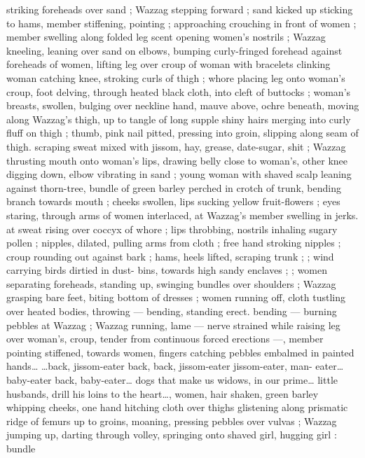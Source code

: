 {striking foreheads over sand ; Wazzag stepping forward ; sand kicked 
up sticking to hams, member stiffening, pointing ; approaching 
crouching in front of women ; member swelling along folded leg 
scent opening women's nostrils ; Wazzag kneeling, leaning over sand 
on elbows, bumping curly-fringed forehead against foreheads of 
women, lifting leg over croup of woman with bracelets clinking 
woman catching knee, stroking curls of thigh ; whore placing leg 
onto woman's croup, foot delving, through heated black cloth, into 
cleft of buttocks ; woman's breasts, swollen, bulging over neckline 
hand, mauve above, ochre beneath, moving along Wazzag's thigh, up 
to tangle of long supple shiny hairs merging into curly fluff on thigh 
; thumb, pink nail pitted, pressing into groin, slipping along seam of 
thigh. scraping sweat mixed with jissom, hay, grease, date-sugar, shit 
; Wazzag thrusting mouth onto woman's lips, drawing belly close to 
woman's, other knee digging down, elbow vibrating in sand ; young 
woman with shaved scalp leaning against thorn-tree, bundle of green 
barley perched in crotch of trunk, bending branch towards mouth ; 
cheeks swollen, lips sucking yellow fruit-flowers ; eyes staring, 
through arms of women interlaced, at Wazzag's member swelling in 
jerks. at sweat rising over coccyx of whore ; lips throbbing, nostrils 
inhaling sugary pollen ; nipples, dilated, pulling arms from cloth ; 
free hand stroking nipples ; croup rounding out against bark ; hams, 
heels lifted, scraping trunk ; ; wind carrying birds dirtied in dust- 
bins, towards high sandy enclaves ; ; women separating foreheads, 
standing up, swinging bundles over shoulders ; Wazzag grasping 
bare feet, biting bottom of dresses ; women running off, cloth 
tustling over heated bodies, throwing --- bending, standing erect. 
bending --- burning pebbles at Wazzag ; Wazzag running, lame --- 
nerve strained while raising leg over woman's, croup, tender from 
continuous forced erections ---, member pointing stiffened, towards 
women, fingers catching pebbles embalmed in painted hands{\ldots} 
{\gl}{\ldots}back, jissom-eater{\td} back, back, jissom-eater{\td} jissom-eater, man- 
eater{\ldots} baby-eater{\td} back, baby-eater{\ldots} dogs that make us widows, in 
our prime{\ldots} little husbands, drill his loins to the heart{\ldots}{\gr}, women, 
hair shaken, green barley whipping cheeks, one hand hitching cloth 
over thighs glistening along prismatic ridge of femurs up to groins, 
moaning, pressing pebbles over vulvas ; Wazzag jumping up, darting 
through volley, springing onto shaved girl, hugging girl : bundle 
}

